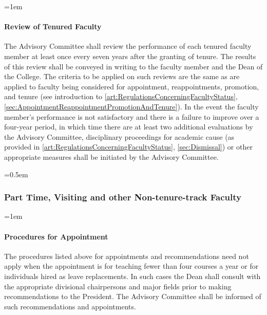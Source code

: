 \documentclass{manual}
\let\oldsubsubsection\subsubsection
\renewcommand\subsubsection{\leftskip=0.5em\oldsubsubsection}
\let\oldparagraph\paragraph
\renewcommand\paragraph{\leftskip=1em\oldparagraph}
\begin{document}
\paragraph{Review of Tenured Faculty}\label{par:ReviewOfTenuredFaculty}
The Advisory Committee shall review the performance of each tenured faculty member at least once every seven years after the granting of tenure. The results of this review shall be conveyed in writing to the faculty member and the Dean of the College. The criteria to be applied on such reviews are the same as are applied to faculty being considered for appointment, reappointments, promotion, and tenure (see introduction to \cref{art:RegulationsConcerningFacultyStatus}, \cref{sec:AppointmentReappointmentPromotionAndTenure}). In the event the faculty member's performance is not satisfactory and there is a failure to improve over a four-year period, in which time there are at least two additional evaluations by the Advisory Committee, disciplinary proceedings for academic cause (as provided in \cref{art:RegulationsConcerningFacultyStatus}, \cref{sec:Dismissal}) or other appropriate measures shall be initiated by the Advisory Committee.

\subsubsection{Part Time, Visiting and other Non-tenure-track Faculty}\label{sub:PartTimeVisitingAndOtherNonTenureTrackFaculty}

\paragraph{Procedures for Appointment}
The procedures listed above for appointments and recommendations need not apply when the appointment is for teaching fewer than four courses a year or for individuals hired as leave replacements. In such cases the Dean shall consult with the appropriate divisional chairpersons and major fields prior to making recommendations to the President. The Advisory Committee shall be informed of such recommendations and appointments.

\end{document}
